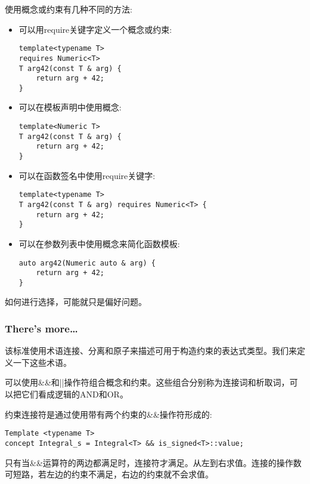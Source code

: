 使用概念或约束有几种不同的方法:

\begin{itemize}
\item 
可以用require关键字定义一个概念或约束:

\begin{lstlisting}[style=styleCXX]
template<typename T>
requires Numeric<T>
T arg42(const T & arg) {
	return arg + 42;
}
\end{lstlisting}

\item 
可以在模板声明中使用概念:

\begin{lstlisting}[style=styleCXX]
template<Numeric T>
T arg42(const T & arg) {
	return arg + 42;
}
\end{lstlisting}

\item 
可以在函数签名中使用require关键字:

\begin{lstlisting}[style=styleCXX]
template<typename T>
T arg42(const T & arg) requires Numeric<T> {
	return arg + 42;
}
\end{lstlisting}

\item 
可以在参数列表中使用概念来简化函数模板:

\begin{lstlisting}[style=styleCXX]
auto arg42(Numeric auto & arg) {
	return arg + 42;
}
\end{lstlisting}
\end{itemize}

如何进行选择，可能就只是偏好问题。

\subsubsection{There's more…}

该标准使用术语连接、分离和原子来描述可用于构造约束的表达式类型。我们来定义一下这些术语。

可以使用\&\&和||操作符组合概念和约束。这些组合分别称为连接词和析取词，可以把它们看成逻辑的AND和OR。

约束连接符是通过使用带有两个约束的\&\&操作符形成的:

\begin{lstlisting}[style=styleCXX]
Template <typename T>
concept Integral_s = Integral<T> && is_signed<T>::value;
\end{lstlisting}

只有当\&\&运算符的两边都满足时，连接符才满足。从左到右求值。连接的操作数可短路，若左边的约束不满足，右边的约束就不会求值。


